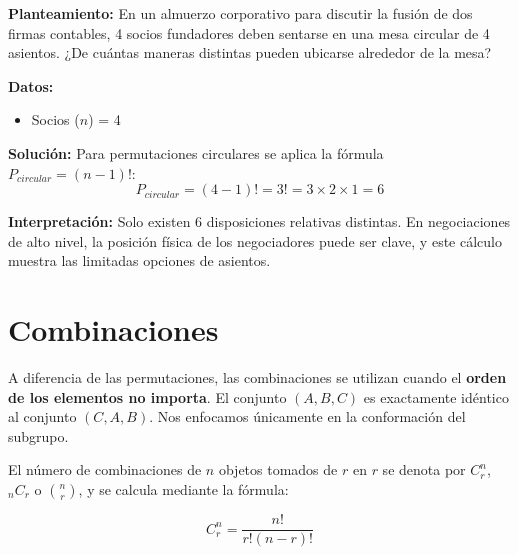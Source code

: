 \documentclass[12pt,letterpaper]{book}
\newcounter{ejemplo}[chapter]
\begin{document}
\begin{ejemplo}
    \textbf{Planteamiento:} En un almuerzo corporativo para discutir la fusión de dos firmas contables, 4 socios fundadores deben sentarse en una mesa circular de 4 asientos. ¿De cuántas maneras distintas pueden ubicarse alrededor de la mesa?
    
    \textbf{Datos:}
    \begin{itemize}
        \item Socios ($n$) = 4
    \end{itemize}
    
    \textbf{Solución:}
    Para permutaciones circulares se aplica la fórmula $P_{circular} = (n-1)!$:
    \[ P_{circular} = (4-1)! = 3! = 3 \times 2 \times 1 = 6 \]
    
    \textbf{Interpretación:} Solo existen 6 disposiciones relativas distintas. En negociaciones de alto nivel, la posición física de los negociadores puede ser clave, y este cálculo muestra las limitadas opciones de asientos.
\end{ejemplo}

\section{Combinaciones}

A diferencia de las permutaciones, las combinaciones se utilizan cuando el \textbf{orden de los elementos no importa}. El conjunto $(A, B, C)$ es exactamente idéntico al conjunto $(C, A, B)$. Nos enfocamos únicamente en la conformación del subgrupo.

\begin{definicion}
    El número de combinaciones de $n$ objetos tomados de $r$ en $r$ se denota por $C_{r}^{n}$, $_{n}C_{r}$ o $\binom{n}{r}$, y se calcula mediante la fórmula:
    \begin{formulaclave}
        \[ C_{r}^{n} = \frac{n!}{r!(n-r)!} \]
    \end{formulaclave}
\end{definicion}
\end{document}
